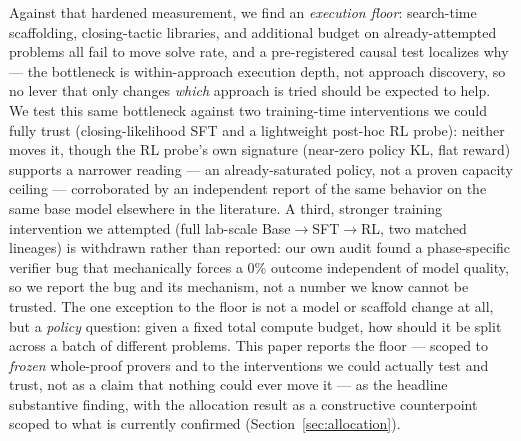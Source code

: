 \documentclass{article}
\begin{document}
Against that hardened measurement, we find an \emph{execution floor}: search-time scaffolding, closing-tactic libraries, and additional
budget on already-attempted problems all fail to move solve rate, and a pre-registered causal test
localizes why --- the bottleneck is within-approach execution depth, not approach discovery, so no
lever that only changes \emph{which} approach is tried should be expected to help. We test this same
bottleneck against two training-time interventions we could fully trust (closing-likelihood SFT and a
lightweight post-hoc RL probe): neither moves it, though the RL probe's own signature (near-zero
policy KL, flat reward) supports a narrower reading --- an already-saturated policy, not a proven
capacity ceiling --- corroborated by an independent report of the same behavior on the same base model
elsewhere in the literature. A third, stronger training intervention we attempted (full lab-scale
Base$\to$SFT$\to$RL, two matched lineages) is withdrawn rather than reported: our own audit found a
phase-specific verifier bug that mechanically forces a 0\% outcome independent of model quality, so we
report the bug and its mechanism, not a number we know cannot be trusted. The one exception to the
floor is not a model or scaffold change at all, but a \emph{policy} question: given a fixed total
compute budget, how should it be split across a batch of different problems. This paper reports the
floor --- scoped to \emph{frozen} whole-proof provers and to the interventions we could actually test
and trust, not as a claim that nothing could ever move it --- as the headline substantive finding, with
the allocation result as a constructive counterpoint scoped to what is currently confirmed
(Section~\ref{sec:allocation}).
\end{document}
